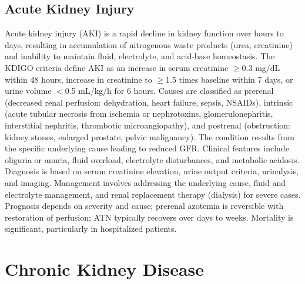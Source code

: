 \subsection{Acute Kidney Injury}
\label{sec:Acute Kidney Injury}
Acute kidney injury (AKI) is a rapid decline in kidney function over hours to days, resulting in accumulation of nitrogenous waste products (urea, creatinine) and inability to maintain fluid, electrolyte, and acid-base homeostasis. The KDIGO criteria define AKI as an increase in serum creatinine $\geq$0.3 mg/dL within 48 hours, increase in creatinine to $\geq$1.5 times baseline within 7 days, or urine volume $<$0.5 mL/kg/h for 6 hours. Causes are classified as prerenal (decreased renal perfusion: dehydration, heart failure, sepsis, NSAIDs), intrinsic (acute tubular necrosis from ischemia or nephrotoxins, glomerulonephritis, interstitial nephritis, thrombotic microangiopathy), and postrenal (obstruction: kidney stones, enlarged prostate, pelvic malignancy). The condition results from the specific underlying cause leading to reduced GFR. Clinical features include oliguria or anuria, fluid overload, electrolyte disturbances, and metabolic acidosis. Diagnosis is based on serum creatinine elevation, urine output criteria, urinalysis, and imaging. Management involves addressing the underlying cause, fluid and electrolyte management, and renal replacement therapy (dialysis) for severe cases. Prognosis depends on severity and cause; prerenal azotemia is reversible with restoration of perfusion; ATN typically recovers over days to weeks. Mortality is significant, particularly in hospitalized patients.

\section{Chronic Kidney Disease}







